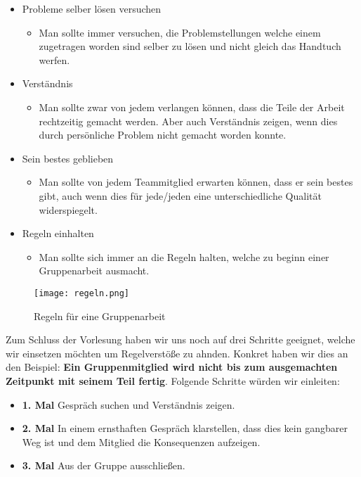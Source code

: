 \documentclass[12pt]{article}
\begin{document}
\begin{itemize}
\begin{itemize}
 \end{itemize}
 \item Probleme selber lösen versuchen
 \begin{itemize}
  \item [] Man sollte immer versuchen, die Problemstellungen welche einem zugetragen worden sind selber zu lösen und nicht gleich das Handtuch werfen.
 \end{itemize}
 \item Verständnis
 \begin{itemize}
  \item [] Man sollte zwar von jedem verlangen können, dass die Teile der Arbeit rechtzeitig gemacht werden. Aber auch Verständnis zeigen, wenn dies durch persönliche Problem nicht gemacht worden konnte.
 \end{itemize}
 \item Sein bestes geblieben
 \begin{itemize}
  \item [] Man sollte von jedem Teammitglied erwarten können, dass er sein bestes gibt, auch wenn dies für jede/jeden eine unterschiedliche Qualität widerspiegelt.
 \end{itemize}
 \item Regeln einhalten
 \begin{itemize}
  \item [] Man sollte sich immer an die Regeln halten, welche zu beginn einer Gruppenarbeit ausmacht.
 \end{itemize}
 \pagebreak
\end{itemize}
\begin{figure}[!ht]
 \begin{center}
  \texttt{[image: regeln.png]}
 \end{center}
 \caption{Regeln für eine Gruppenarbeit}
\end{figure}
\pagebreak
Zum Schluss der Vorlesung haben wir uns noch auf drei Schritte geeignet, welche wir einsetzen möchten um Regelverstöße zu ahnden. Konkret haben wir dies an den Beispiel: \textbf{Ein Gruppenmitglied wird nicht bis zum ausgemachten Zeitpunkt mit seinem Teil fertig}. Folgende Schritte würden wir einleiten:
\begin{itemize}
 \item [] \textbf{1. Mal} Gespräch suchen und Verständnis zeigen.
 \item [] \textbf{2. Mal} In einem ernsthaften Gespräch klarstellen, dass dies kein gangbarer Weg ist und dem Mitglied die Konsequenzen aufzeigen.
 \item [] \textbf{3. Mal} Aus der Gruppe ausschließen.
\end{itemize}
\end{document}
